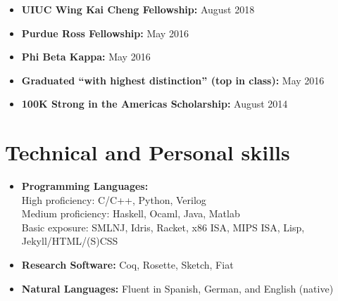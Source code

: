 \documentclass[10pt,a4paper,sans]{moderncv}        %
\begin{document}
\vspace{4pt}

\begin{itemize}

\item \textbf{UIUC Wing Kai Cheng Fellowship:} August 2018
\item \textbf{Purdue Ross Fellowship:} May 2016
\vspace{4pt}
\item \textbf{Phi Beta Kappa:} May 2016
\vspace{4pt}
\item \textbf{Graduated ``with highest distinction'' (top in class):} May 2016
\vspace{4pt}
\item \textbf{100K Strong in the Americas Scholarship:} August 2014

\end{itemize}

\section{Technical and Personal skills}

\vspace{4pt}

\begin{itemize}

\item \textbf{Programming Languages:} \\
  High proficiency: C/C++, Python, Verilog
  \\ Medium proficiency: Haskell, Ocaml, Java, Matlab
  \\ Basic exposure: SMLNJ, Idris, Racket, x86 ISA, MIPS ISA, Lisp,
  Jekyll/HTML/(S)CSS

\vspace{4pt}

\item \textbf{Research Software:} Coq, Rosette, Sketch, Fiat

\vspace{4pt}

\item \textbf{Natural Languages:} Fluent in Spanish, German, and English (native)

\vspace{4pt}


\end{itemize}
\end{document}
